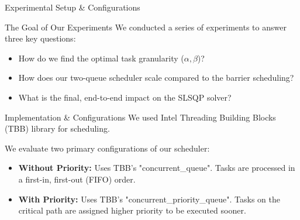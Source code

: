 \begin{frame}{Experimental Setup \& Configurations}

	\pause
	\begin{block}{The Goal of Our Experiments}
		We conducted a series of experiments to answer three key questions:
		\begin{itemize}
			\item How do we find the optimal task granularity ($\alpha, \beta$)?
			\item How does our two-queue scheduler scale compared to the barrier scheduling?
			\item What is the final, end-to-end impact on the SLSQP solver?
		\end{itemize}
	\end{block}
	
	\pause
	\begin{alertblock}{Implementation \& Configurations}
		We used Intel Threading Building Blocks (TBB) library for scheduling.
		\vspace{1mm}
		
		We evaluate two primary configurations of our scheduler:
		\begin{itemize}
			\item \textbf{Without Priority:} Uses TBB's "concurrent\_queue". Tasks are processed in a first-in, first-out (FIFO) order.
			\item \textbf{With Priority:} Uses TBB's "concurrent\_priority\_queue". Tasks on the critical path are assigned higher priority to be executed sooner.
		\end{itemize}
	\end{alertblock}

\end{frame}